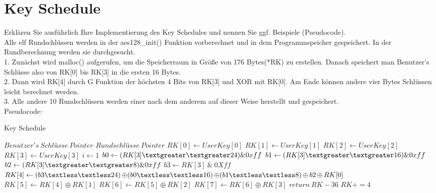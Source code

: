 \documentclass[abstract,bibliography=totocnumbered,listof=leveldown,open=any,titlepage]{scrreprt}
\DeclareMathOperator*{\OPLUS}{\oplus}
\begin{document}
		\begin{algorithm}		
			
		\end{algorithm}
		
        \section{Key Schedule}

		Erklären Sie ausführlich Ihre Implementierung des Key Schedules und nennen Sie ggf. Beispiele (Pseudocode).\vspace{3mm} \\
		Alle elf Rundschlüssen werden in der aes128\_init() Funktion vorberechnet und in dem Programmspeicher gespeichert. In der Rundberechnung werden sie durchgesucht.\vspace{1mm} \\
		1. Zunächst wird malloc() aufgerufen, um die Speicherraum in Größe von 176 Bytes(*RK) zu erstellen. Danach speichert man Benutzer's Schlüsse also von RK[0] bis RK[3] in die ersten 16 Bytes.  \\
		2. Dann wird RK[4] durch G Funktion der höchsten 4 Bits von RK[3] und XOR mit RK[0]. Am Ende können andere vier Bytes Schlüssen leicht berechnet werden.\\
		3. Alle andere 10 Rundschlüssen werden einer nach dem anderem auf dieser Weise herstellt und gespeichert.\vspace{1mm}\\
		Pseudocode: 
		\begin{algorithm}  %
			\caption{Key Schedule}   %
			\label{alg1} %
			\begin{algorithmic}                    %
				\REQUIRE $Benutzer's\ Schlüsse\ Pointer$
				\ENSURE $Rundschlüsse\ Pointer$
				\STATE ${RK[0] \gets UserKey[0]}$
				\STATE ${RK[1] \gets UserKey[1]}$
				\STATE ${RK[2] \gets UserKey[2]}$
				\STATE ${RK[3] \gets UserKey[3]}$
				\STATE ${i \gets 1}$
					\STATE ${b0 \gets (RK[3]\textgreater \textgreater 24)\& 0xff}$
					\STATE ${b1 \gets (RK[3]\textgreater \textgreater 16)\& 0xff}$
					\STATE ${b2 \gets (RK[3]\textgreater \textgreater 8)\& 0xff}$
					\STATE ${b3 \gets RK[3]\ \&\ 0Xff}$  	 
					\STATE ${RK[4] \gets (b3\textless \textless 24) \OPLUS (b0\textless \textless 16)\OPLUS(b1\textless \textless 8)\OPLUS b2 \OPLUS RK[0]}$
					\STATE ${RK[5] \gets RK[4] \OPLUS RK[1]}$
					\STATE ${RK[6] \gets RK[5] \OPLUS RK[2]}$
					\STATE ${RK[7] \gets RK[6] \OPLUS RK[3]}$
						\STATE ${return\ RK-36}$
					\ENDIF
					\STATE ${RK+=4}$
				\ENDWHILE
			\end{algorithmic}
		\end{algorithm}
\end{document}
